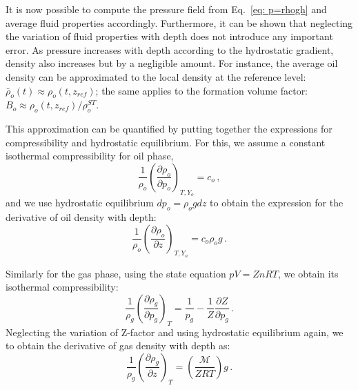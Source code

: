 \documentclass[authoryear,preprint,review,11pt]{elsarticle}
\begin{document}
It is now possible to compute the pressure field from Eq.~\eqref{eq: p=rhogh} and average fluid properties accordingly. Furthermore, it can be shown that neglecting the variation of fluid properties with depth does not introduce any important error. As pressure increases with depth according to the hydrostatic gradient, density also increases but by a negligible amount. For instance, the average oil density can be approximated to the local density at the reference level: $\bar{\rho}_o (t) \approx \rho_o (t, z_{ref})$; the same applies to the formation volume factor: $B_o \approx \rho_o (t, z_{ref})/ \rho_o^{ST}$.


%
%
%
%
%
%
%
%
%

This approximation can be quantified by putting together the expressions for compressibility and hydrostatic equilibrium. For this, we assume a constant isothermal compressibility for oil phase,
\begin{equation}\label{eq: grado}
\frac{1}{\rho_o}\left(\frac{\partial \rho_o}{\partial p_o} \right)_{T,Y_o} = c_o \, ,
\end{equation}
 and we use hydrostatic equilibrium $dp_o = \rho_o g dz$ to obtain the expression for the derivative of oil density with depth:
\begin{equation}\label{eq: gradodz}
 \frac{1}{\rho_o}\left(\frac{\partial \rho_o}{\partial z} \right)_{T,Y_o} = c_o \rho_o g \, .
\end{equation}

Similarly for the gas phase, using the state equation $pV = Zn R T$, we obtain its isothermal compressibility:
\begin{equation}
\frac{1}{\rho_g}\left(\frac{\partial \rho_g}{\partial p_g}\right)_{T} = \frac{1}{p_g}-\frac{1}{Z}\frac{\partial Z}{\partial p_g} \, .
\end{equation}
Neglecting the variation of Z-factor and using hydrostatic equilibrium again, we to obtain the derivative of gas density with depth as:
\begin{equation}\label{eq: gradgdz}
\frac{1}{\rho_g}\left(\frac{\partial \rho_g}{\partial z}\right)_{T} = \left(\frac{\mathcal{M}}{ Z R T}\right) g \, .
\end{equation}
\end{document}
